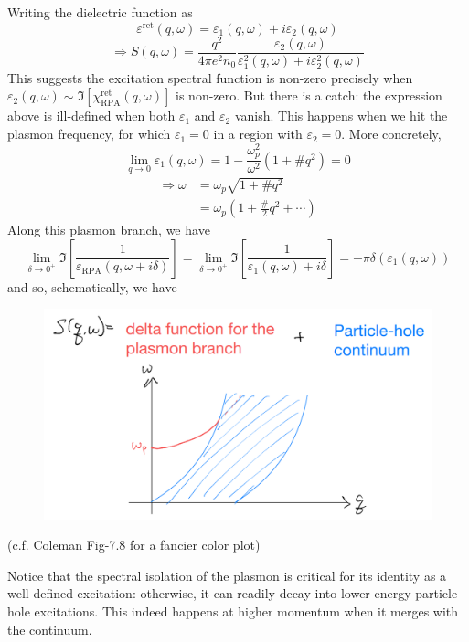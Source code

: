 Writing the dielectric function as
\[ \varepsilon ^{\mathrm{ret}}\left( q,\omega \right) =\varepsilon _1\left( q,\omega \right) +i\varepsilon _2\left( q,\omega \right) \]
\[ \Rightarrow S\left( q,\omega \right) =\frac{q^2}{4\pi e^2n_0}\frac{\varepsilon _2\left( q,\omega \right)}{\varepsilon _{1}^{2}\left( q,\omega \right) +i\varepsilon _{2}^{2}\left( q,\omega \right)}\]
This suggests the excitation spectral function is non-zero precisely when $\varepsilon _2\left( q,\omega \right) \sim \Im \left[ \chi _{\mathrm{RPA}}^{\mathrm{ret}}\left( q,\omega \right) \right] $ is non-zero. But there is a catch: the expression above is ill-defined when both $\varepsilon_1$ and $\varepsilon_2$ vanish. This happens when we hit the plasmon frequency, for which $\varepsilon_1=0$ in a region with $\varepsilon_2=0$. More concretely,
\[ \lim_{q\rightarrow 0} \varepsilon _1\left( q,\omega \right) =1-\frac{\omega _{p}^{2}}{\omega ^2}\left( 1+\#q^2 \right) =0\]
\begin{align*}
    \Rightarrow \omega &=\omega _p\sqrt{1+\#q^2}\\
    &=\omega _p\left( 1+\frac{\#}{2}q^2+\cdots \right)
\end{align*}
Along this plasmon branch, we have
\[ \lim_{\delta \rightarrow 0^+} \Im \left[ \frac{1}{\varepsilon _{\mathrm{RPA}}\left( q,\omega +i\delta \right)} \right] =\lim_{\delta \rightarrow 0^+} \Im \left[ \frac{1}{\varepsilon _1\left( q,\omega \right) +i\delta} \right] =-\pi \delta \left( \varepsilon _1\left( q,\omega \right) \right) \]
and so, schematically, we have
\begin{figure}[H]
    \centering
    \includegraphics[width=\textwidth]{jupyterbook/data/fig/lec21-fig02.png}
\end{figure}
(c.f. Coleman Fig-7.8 for a fancier color plot)

Notice that the spectral isolation of the plasmon is critical for its identity as a well-defined excitation: otherwise, it can readily decay into lower-energy particle-hole excitations. This indeed happens at higher momentum when it merges with the continuum.

